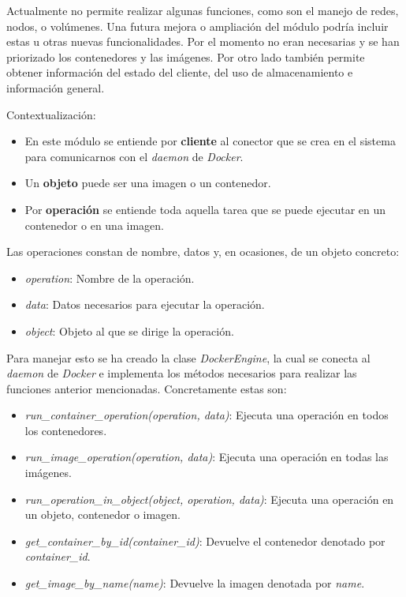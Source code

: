 Actualmente no permite realizar algunas funciones, como son el manejo de redes, nodos, o volúmenes. Una futura mejora o ampliación del módulo podría incluir estas u otras nuevas funcionalidades. Por el momento no eran necesarias y se han priorizado los contenedores y las imágenes. Por otro lado también permite obtener información del estado del cliente, del uso de almacenamiento e información general.

\bigskip
Contextualización:
\begin{itemize}
	\item En este módulo se entiende por \textbf{cliente} al conector que se crea en el sistema para comunicarnos con el \textit{daemon} de \textit{Docker}.
	\item Un \textbf{objeto} puede ser una imagen o un contenedor.
	\item Por \textbf{operación} se entiende toda aquella tarea que se puede ejecutar en un contenedor o en una imagen.
\end{itemize}

\bigskip
Las operaciones constan de nombre, datos y, en ocasiones, de un objeto concreto:
\begin{itemize}
	\item \textit{operation}: Nombre de la operación.
	\item \textit{data}: Datos necesarios para ejecutar la operación.
	\item \textit{object}: Objeto al que se dirige la operación.
\end{itemize}


\bigskip
Para manejar esto se ha creado la clase \textit{DockerEngine}, la cual se conecta al \textit{daemon} de \textit{Docker} e implementa los métodos necesarios para realizar las funciones anterior mencionadas. Concretamente estas son:
\begin{itemize}
	\item \textit{run\_container\_operation(operation, data)}: Ejecuta una operación en todos los contenedores.
	\item \textit{run\_image\_operation(operation, data)}: Ejecuta una operación en todas las imágenes.
	\item \textit{run\_operation\_in\_object(object, operation, data)}: Ejecuta una operación en un objeto, contenedor o imagen.
	\item \textit{get\_container\_by\_id(container\_id)}: Devuelve el contenedor denotado por \textit{container\_id}.
	\item \textit{get\_image\_by\_name(name)}: Devuelve la imagen denotada por \textit{name}.
\end{itemize}


